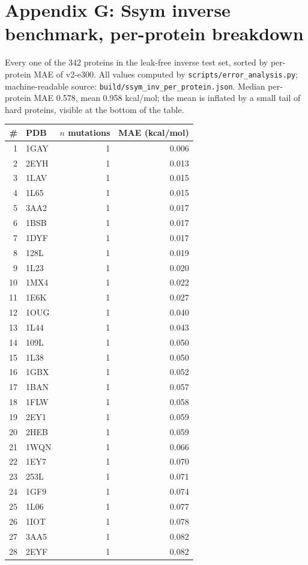 \section*{Appendix G: Ssym inverse benchmark, per-protein breakdown}
Every one of the 342 proteins in the leak-free inverse test set, sorted by
per-protein MAE of v2-e300. All values computed by
\texttt{scripts/error\_analysis.py}; machine-readable source:
\texttt{build/ssym\_inv\_per\_protein.json}. Median per-protein MAE 0.578,
mean 0.958 kcal/mol; the mean is inflated by a small tail of hard proteins,
visible at the bottom of the table.
\begin{longtable}{r l r r}
\hline
\# & PDB & $n$ mutations & MAE (kcal/mol) \\ \hline
\endhead
1 & 1GAY & 1 & 0.006 \\
2 & 2EYH & 1 & 0.013 \\
3 & 1LAV & 1 & 0.015 \\
4 & 1L65 & 1 & 0.015 \\
5 & 3AA2 & 1 & 0.017 \\
6 & 1BSB & 1 & 0.017 \\
7 & 1DYF & 1 & 0.017 \\
8 & 128L & 1 & 0.019 \\
9 & 1L23 & 1 & 0.020 \\
10 & 1MX4 & 1 & 0.022 \\
11 & 1E6K & 1 & 0.027 \\
12 & 1OUG & 1 & 0.040 \\
13 & 1L44 & 1 & 0.043 \\
14 & 109L & 1 & 0.050 \\
15 & 1L38 & 1 & 0.050 \\
16 & 1GBX & 1 & 0.052 \\
17 & 1BAN & 1 & 0.057 \\
18 & 1FLW & 1 & 0.058 \\
19 & 2EY1 & 1 & 0.059 \\
20 & 2HEB & 1 & 0.059 \\
21 & 1WQN & 1 & 0.066 \\
22 & 1EY7 & 1 & 0.070 \\
23 & 253L & 1 & 0.071 \\
24 & 1GF9 & 1 & 0.074 \\
25 & 1L06 & 1 & 0.077 \\
26 & 1IOT & 1 & 0.078 \\
27 & 3AA5 & 1 & 0.082 \\
28 & 2EYF & 1 & 0.082 \\

\end{longtable}
